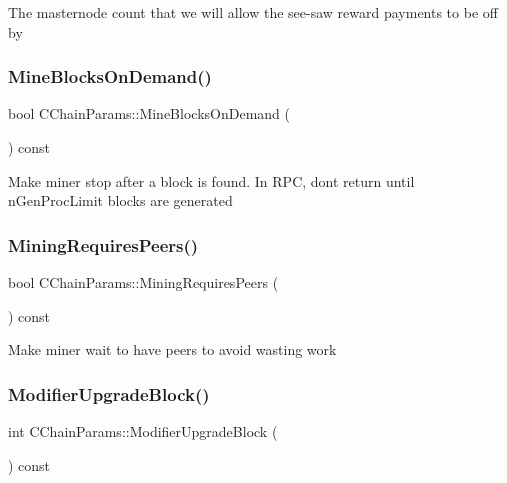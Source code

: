 The masternode count that we will allow the see-\/saw reward payments to be off by \mbox{\label{class_c_chain_params_a96be31ff3d8525c9d5458b7d07ada6bb}} 
\subsubsection{\texorpdfstring{Mine\+Blocks\+On\+Demand()}{MineBlocksOnDemand()}}
{\footnotesize\ttfamily bool C\+Chain\+Params\+::\+Mine\+Blocks\+On\+Demand (\begin{DoxyParamCaption}{ }\end{DoxyParamCaption}) const\hspace{0.3cm}{\ttfamily [inline]}}

Make miner stop after a block is found. In R\+PC, don\textquotesingle{}t return until n\+Gen\+Proc\+Limit blocks are generated \mbox{\label{class_c_chain_params_a066ad4166984a31bdc0836193a6341ee}} 
\subsubsection{\texorpdfstring{Mining\+Requires\+Peers()}{MiningRequiresPeers()}}
{\footnotesize\ttfamily bool C\+Chain\+Params\+::\+Mining\+Requires\+Peers (\begin{DoxyParamCaption}{ }\end{DoxyParamCaption}) const\hspace{0.3cm}{\ttfamily [inline]}}

Make miner wait to have peers to avoid wasting work \mbox{\label{class_c_chain_params_ad166dbdd9631958fa0126e13dec1630a}} 
\subsubsection{\texorpdfstring{Modifier\+Upgrade\+Block()}{ModifierUpgradeBlock()}}
{\footnotesize\ttfamily int C\+Chain\+Params\+::\+Modifier\+Upgrade\+Block (\begin{DoxyParamCaption}{ }\end{DoxyParamCaption}) const\hspace{0.3cm}{\ttfamily [inline]}}

